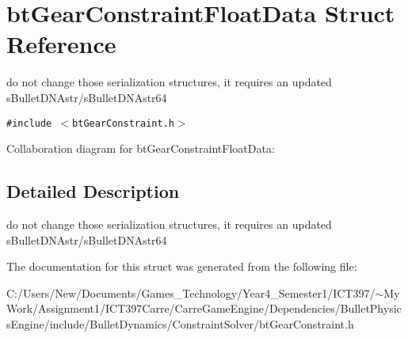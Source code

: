 \hypertarget{structbt_gear_constraint_float_data}{
\section{btGearConstraintFloatData Struct Reference}
\label{structbt_gear_constraint_float_data}
}
do not change those serialization structures, it requires an updated sBulletDNAstr/sBulletDNAstr64  


{\tt \#include $<$btGearConstraint.h$>$}

Collaboration diagram for btGearConstraintFloatData:

\subsection{Detailed Description}
do not change those serialization structures, it requires an updated sBulletDNAstr/sBulletDNAstr64 

The documentation for this struct was generated from the following file:\begin{CompactItemize}
\item 
C:/Users/New/Documents/Games\_\-Technology/Year4\_\-Semester1/ICT397/$\sim$My Work/Assignment1/ICT397Carre/CarreGameEngine/Dependencies/BulletPhysicsEngine/include/BulletDynamics/ConstraintSolver/btGearConstraint.h\end{CompactItemize}

